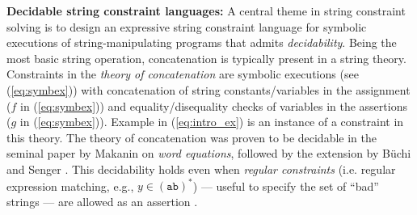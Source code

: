 \smallskip
\noindent
\textbf{Decidable string constraint languages:}
A central theme in string constraint solving is to design an
expressive string constraint language for symbolic executions of 
string-manipulating
programs that admits \emph{decidability}. 
Being the most basic string operation,
concatenation is typically present in a string theory.
Constraints in the \emph{theory of concatenation} 
are symbolic executions (see (\ref{eq:symbex}))
with concatenation of string constants/variables in the
assignment ($f$ in (\ref{eq:symbex})) and equality/disequality checks of
variables in the assertions ($g$ in (\ref{eq:symbex})).
Example in (\ref{eq:intro_ex}) is an instance of a constraint in this theory.
The theory of concatenation was 
proven to be decidable in the seminal
paper by Makanin \cite{Makanin} on \emph{word equations}, followed by the
extension by B\"{u}chi and Senger \cite{buchi}.
This decidability holds even when
\emph{regular constraints} (i.e. regular expression matching, e.g., 
$y \in (\texttt{ab})^*$) --- useful to specify the set of ``bad'' strings ---
are allowed as an assertion \cite{Schulz}. 

